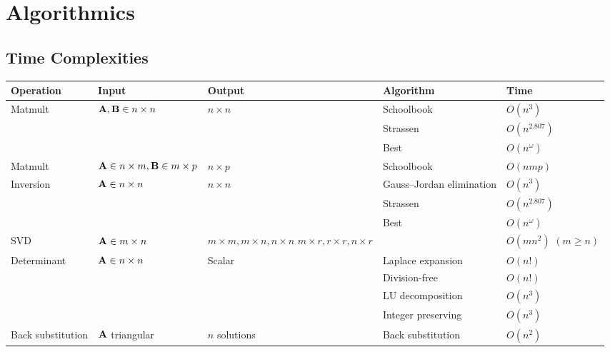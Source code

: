 \chapter{Algorithmics}

\section{Time Complexities}
\begin{center}
{\footnotesize\renewcommand{\arraystretch}{1.2}
\begin{tabular}{p{1.5cm}p{3cm}p{3cm}p{4cm}p{1cm}}
\textbf{Operation}             & \textbf{Input}                   & \textbf{Output}    & \textbf{Algorithm}                     & \textbf{Time}   \\ \hline
Matmult
    & $\mathbf{A},\mathbf{B}\in n\times n$
    & $n \times n$
    & Schoolbook
    & $O(n^3)$
    \\ \hline

    &
    &
    & Strassen~\citep{Strassen1969}
    & $O(n^{2.807})$
    \\ \hline

    &
    &
    & Best
    & $O(n^\omega)$
    \\ \hline
Matmult
    & $\mathbf{A}\in n\times m, \mathbf{B}\in m\times p$
    & $n \times p$
    & Schoolbook
    & $O(nmp)$
    \\ \hline
Inversion
    & $\mathbf{A}\in n\times n$
    & $n \times n$
    & Gauss--Jordan elimination
    & $O(n^3)$
    \\ \hline

    &
    &
    & Strassen~\citep{Strassen1969}
    & $O(n^{2.807})$
    \\ \hline

    &
    &
    & Best
    & $O(n^\omega)$
    \\ \hline
SVD
    & $\mathbf{A}\in m\times n$
    & $m\times m, m\times n, n\times n$ \newline $m\times r, r\times r, n\times r$
    &
    & $O(mn^2)$ \newline \hbox{$(m\ge n)$} \\ \hline
Determinant
    & $\mathbf{A}\in n\times n$
    & Scalar
    & Laplace expansion
    & $O(n!)$         \\ \hline

    &
    &
    & Division-free~\citep{Rote2001}
    & $O(n!)$
    \\ \hline

    &
    &
    & LU decomposition
    & $O(n^3)$
    \\ \hline

    &
    &
    & Integer preserving~\citep{Bareiss1968}
    & $O(n^3)$
    \\ \hline
Back \newline substitution
    & $\mathbf{A}$ triangular
    & $n$ solutions
    & Back substitution
    & $O(n^2)$
    \\ \hline
\end{tabular}
}
\end{center}

